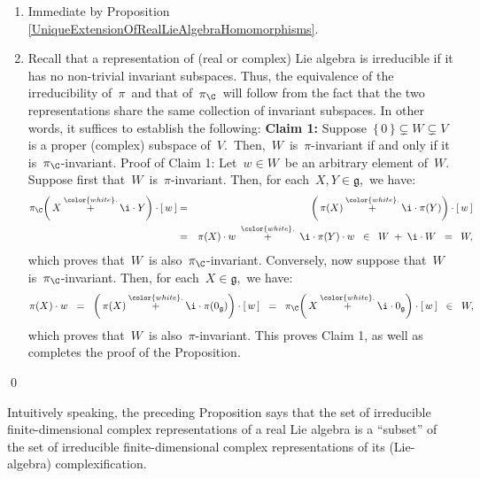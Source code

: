 \begin{enumerate}
\item
	Immediate by Proposition \ref{UniqueExtensionOfRealLieAlgebraHomomorphisms}.
\item
	Recall that a representation of (real or complex) Lie algebra is irreducible if it has
	no non-trivial invariant subspaces.
	Thus, the equivalence of the irreducibility of \,$\pi$\, and that of \,$\pi_{\C}$\,
	will follow from the fact that the two representations share the same collection
	of invariant subspaces. In other words, it suffices to establish the following:
	\vskip 0.2cm
	\noindent
	\textbf{Claim 1:}\quad
	Suppose \,$\{\,0\,\} \subsetneq W \subsetneq V$\, is a proper (complex) subspace of \,$V$.\,
	Then, \,$W$\, is \,$\pi$-invariant if and only if it is \,$\pi_{\C}$-invariant. 
	\vskip 0.1cm
	\noindent
	Proof of Claim 1:\quad
	Let \,$w \in W$\, be an arbitrary element of \,$W$.\,
	Suppose first that \,$W$\, is \,$\pi$-invariant.
	Then, for each \,$X, Y \in \mathfrak{g}$,\, we have:
	\begin{eqnarray*}
	\pi_{\C}\!\left(\,X \overset{{\color{white}.}}{+} \i\cdot Y \right) \cdot [\,w\,]
	& = &
		\left(\,\pi(X) \overset{{\color{white}.}}{+} \i\cdot \pi(Y) \right) \cdot [\,w\,]
	\\
	& = &
		\pi(X) \cdot w \;\overset{{\color{white}.}}{+}\; \i\cdot \pi(Y) \cdot w
	\;\; \in \;\;
		W \; + \; \i \cdot W
	\;\; = \;\;
		W,
	\end{eqnarray*}
	which proves that \,$W$\, is also \,$\pi_{\C}$-invariant.
	Conversely, now suppose that \,$W$\, is \,$\pi_{\C}$-invariant.
	Then, for each \,$X \in \mathfrak{g}$,\, we have:
	\begin{equation*}
	\pi(X)\cdot w
	\;\; = \;\;
		\left(\,\pi(X) \overset{{\color{white}.}}{+} \i\cdot \pi(0_{\mathfrak{g}}) \right) \cdot [\,w\,]
	\;\; = \;\;
		\pi_{\C}\!\left(\,X \overset{{\color{white}.}}{+} \i\cdot 0_{\mathfrak{g}} \right) \cdot [\,w\,]
	\;\; \in \;\;
		W,
	\end{equation*}
	which proves that \,$W$\, is also \,$\pi$-invariant.
	This proves Claim 1, as well as completes the proof of the Proposition.
\end{enumerate}
\qed

\vskip 0.5cm
\begin{remark}
\mbox{}
\vskip 0.05cm
\noindent
Intuitively speaking, the preceding Proposition says that
the set of irreducible finite-dimensional complex representations of a real Lie algebra
is a ``subset'' of 
the set of irreducible finite-dimensional complex representations of its (Lie-algebra) complexification.
\end{remark}

